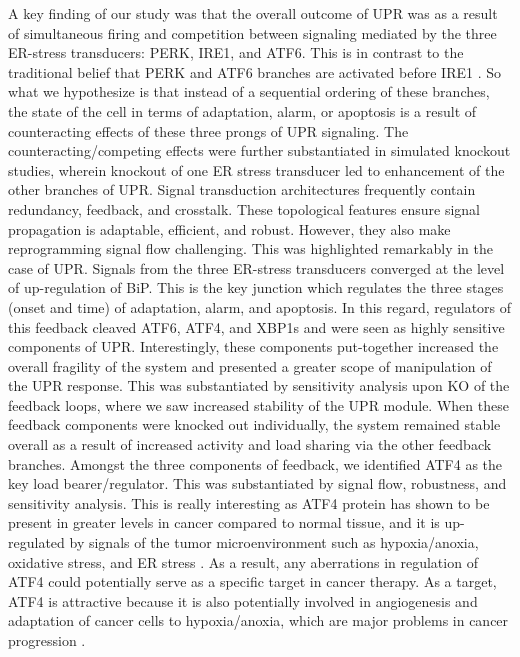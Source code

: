 \documentclass[fleqn,10pt]{wlscirep}
\begin{document}
A key finding of our study was that the overall outcome of UPR was as a result of simultaneous firing and competition between signaling mediated by the three ER-stress transducers: PERK, IRE1, and ATF6.
This is in contrast to the traditional belief that PERK and ATF6 branches are activated before IRE1 \cite{szegezdi2006mediators}.
So what we hypothesize is that instead of a sequential ordering of these branches, the state of the cell in terms of adaptation, alarm, or apoptosis is a result of counteracting effects of these three prongs of UPR signaling.
The counteracting/competing effects were further substantiated in simulated knockout studies, wherein knockout of one ER stress transducer led to enhancement of the other branches of UPR.
Signal transduction architectures frequently contain redundancy, feedback, and crosstalk. These topological features ensure signal propagation is adaptable, efficient, and robust.
However, they also make reprogramming signal flow challenging. This was highlighted remarkably in the case of UPR. Signals from the three ER-stress transducers converged at the level of up-regulation of BiP.
This is the key junction which regulates the three stages (onset and time) of adaptation, alarm, and apoptosis. In this regard, regulators of this feedback cleaved ATF6, ATF4, and XBP1s and were seen as highly sensitive components of UPR.
Interestingly, these components put-together increased the overall fragility of the system and presented a greater scope of manipulation of the UPR response.
This was substantiated by sensitivity analysis upon KO of the feedback loops, where we saw increased stability of the UPR module.
When these feedback components were knocked out individually, the system remained stable overall as a result of increased activity and load sharing via the other feedback branches.
Amongst the three components of feedback, we identified ATF4 as the key load bearer/regulator. This was substantiated by signal flow, robustness, and sensitivity analysis.
This is really interesting as ATF4 protein has shown to be present in greater levels in cancer compared to normal tissue, and it is up-regulated by signals of the tumor microenvironment such as hypoxia/anoxia, oxidative stress, and ER stress \cite{Ameri:2008fk}.
As a result, any aberrations in regulation of ATF4 could potentially serve as a specific target in cancer therapy.
As a target, ATF4 is attractive because it is also potentially involved in angiogenesis and adaptation of cancer cells to hypoxia/anoxia, which are major problems in cancer progression \cite{Ameri:2008fk}.
\end{document}

